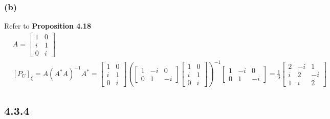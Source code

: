 \documentclass{article}
\begin{document}
\subsubsection*{(b)}
Refer to \textbf{Proposition 4.18}
\begin{equation*}
    \begin{split}
        &A = \begin{bmatrix}
            1 & 0 \\
            i & 1 \\
            0 & i 
        \end{bmatrix}\\
        &[P_U]_\xi = A(A^*A)^{-1}A^* = \begin{bmatrix}
            1 & 0 \\
            i & 1 \\
            0 & i 
        \end{bmatrix} (\begin{bmatrix}
            1 & -i & 0  \\
            0 & 1 & -i 
        \end{bmatrix} \begin{bmatrix}
            1 & 0 \\
            i & 1 \\
            0 & i 
        \end{bmatrix})^{-1} \begin{bmatrix}
            1 & -i & 0  \\
            0 & 1 & -i 
        \end{bmatrix} = \frac{1}{3}\begin{bmatrix}
            2 & -i & 1  \\
            i & 2 & -i  \\
            1 & i & 2 
        \end{bmatrix}
    \end{split}
\end{equation*}

\subsection*{4.3.4}
\end{document}
